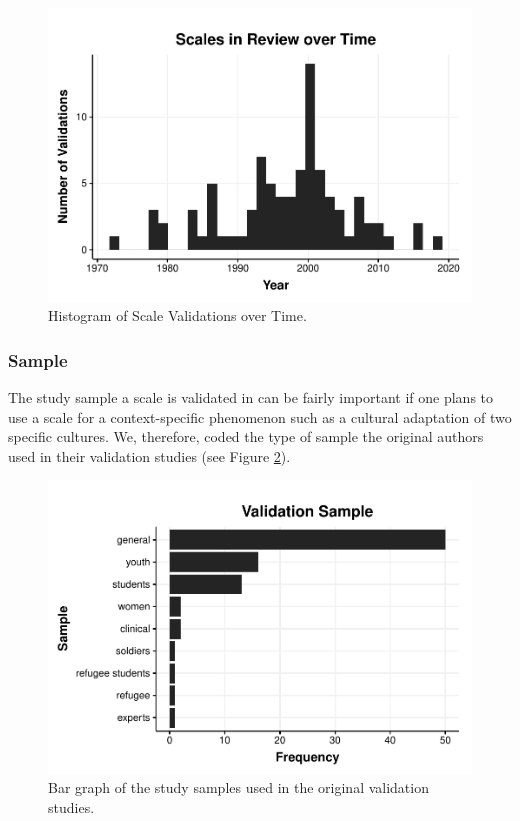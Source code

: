 \documentclass[
  american,
  man]{apa7}
\begin{document}
\begin{figure}
\includegraphics[width=\textwidth]{Figures/HistTime-1} \caption{Histogram of Scale Validations over Time.}\label{fig:HistTime}
\end{figure}

\hypertarget{sample}{%
\subsubsection{Sample}\label{sample}}

The study sample a scale is validated in can be fairly important if one plans to use a scale for a context-specific phenomenon such as a cultural adaptation of two specific cultures. We, therefore, coded the type of sample the original authors used in their validation studies (see Figure \ref{fig:SampleFreq}).

\begin{figure}
\includegraphics[width=\textwidth]{Figures/SampleFreq-1} \caption{Bar graph of the study samples used in the original validation studies.}\label{fig:SampleFreq}
\end{figure}
\end{document}
